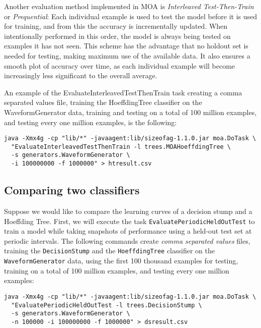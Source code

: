 \documentclass[a4paper,12pt,twoside]{book}
\begin{document}
Another evaluation method implemented in MOA is \emph{Interleaved Test-Then-Train}  or \emph{Prequential}:
 Each individual example is used to test the model
before it is used for training, and from this the accuracy is incrementally
updated. When intentionally performed in this order, the model is always
being tested on examples it has not seen. This scheme has the advantage that
no holdout set is needed for testing, making maximum use of the available
data. It also ensures a smooth plot of accuracy over time, as each individual
example will become increasingly less significant to the overall average.

An example of the EvaluateInterleavedTestThenTrain task  
creating a comma separated values file, training the
HoeffdingTree classifier on the WaveformGenerator data, training and testing on a total of 100 million
examples, and testing every one million examples, is the following:

\begin{footnotesize}\begin{verbatim}
java -Xmx4g -cp "lib/*" -javaagent:lib/sizeofag-1.1.0.jar moa.DoTask \
  "EvaluateInterleavedTestThenTrain -l trees.MOAHoeffdingTree \
  -s generators.WaveformGenerator \
  -i 100000000 -f 1000000" > htresult.csv
\end{verbatim}
\end{footnotesize}

\subsection{Comparing two classifiers}

Suppose we would like to compare the learning curves of a decision stump and a Hoeffding Tree.
First, we will execute the
 task \verb+EvaluatePeriodicHeldOutTest+ to train a model while taking snapshots of performance using a held-out test set at periodic intervals.
The following commands create {\em comma separated values} files, training the \verb+DecisionStump+ and the \verb+HoeffdingTree+ classifier on the \verb+WaveformGenerator+ data, using the first 100 thousand examples for testing, training on a total of 100 million examples, and testing every one million examples:

\begin{footnotesize}\begin{verbatim}
java -Xmx4g -cp "lib/*" -javaagent:lib/sizeofag-1.1.0.jar moa.DoTask \
  "EvaluatePeriodicHeldOutTest -l trees.DecisionStump \
  -s generators.WaveformGenerator \
  -n 100000 -i 100000000 -f 1000000" > dsresult.csv
\end{verbatim}\end{footnotesize}
\end{document}
